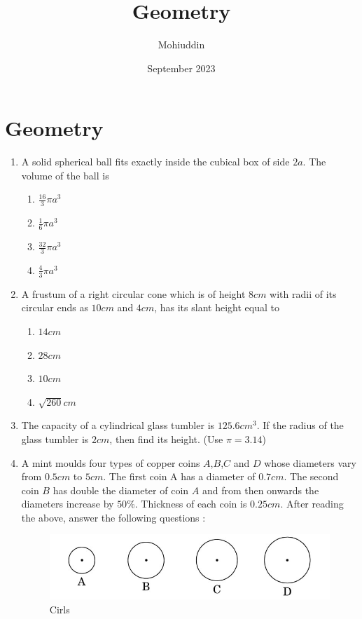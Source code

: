 \documentclass{article}
\title{Geometry}
\author{Mohiuddin}
\date{September 2023}
\begin{document}
\maketitle

\section{Geometry}
\begin{enumerate}
    \item A solid spherical ball fits exactly inside the cubical box of side $2a$. The volume of the ball is 
\begin{enumerate}
    \item $\frac{16}{3}\pi a^3$
    \item $\frac{1}{6}\pi a^3$
    \item $\frac{32}{3}\pi a^3$
        \item $\frac{4}{3}\pi a^3$
    \end{enumerate}
    
    \item A frustum of a right circular cone which is of height $8 cm$ with radii of its circular ends as $10 cm$ and $4 cm$, has its slant height equal to 
\begin{enumerate}
    \item $ 14 cm$
    \item $28 cm$
    \item $10 cm$
    \item $\sqrt{260}cm$
    \end{enumerate}
    
    \item The capacity of a cylindrical glass tumbler is $125.6 cm^3$. If the radius of the glass tumbler is $2 cm$, then find its height. (Use $\pi= 3.14$)
\newpage
\item A mint moulds four types of copper coins $A$,$B$,$C$ and $D$ whose diameters vary from $0.5 cm$ to $5 cm$. The first coin A has a diameter of $0.7 cm$. The second coin $B$ has double the diameter of coin $A$ and from then onwards the diameters increase by $50\%$. Thickness of each coin is $0.25 cm$.
    After reading the above, answer the following questions :
\begin{figure}[H]
    \centering
    \includegraphics[width=\columnwidth]{figs/cirls.png}
    \caption{Cirls}
    \label{tab:copper coins}
    \end{figure}
      

\end{enumerate}
\end{document}
